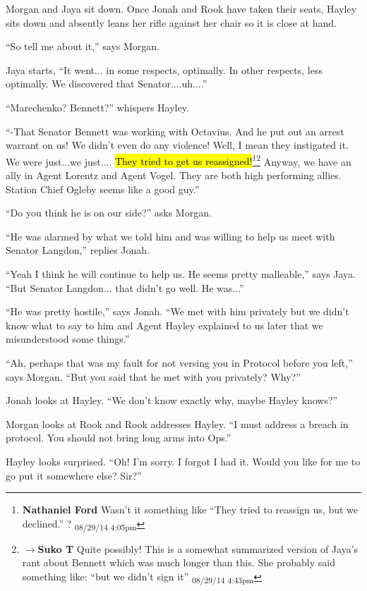Morgan and Jaya sit down.  Once Jonah and Rook have taken their seats, Hayley sits down and absently leans her rifle against her chair so it is close at hand. 

``So tell me about it,'' says Morgan.

Jaya starts, ``It went... in some respects, optimally.  In other respects, less optimally.  We discovered that Senator....uh....''

``Marechenko?  Bennett?'' whispers Hayley.

``-That Senator Bennett was working with Octavius.  And he put out an arrest warrant on us!  We didn't even do any violence! Well, I mean they instigated it.  We were just...we just.... \hl{They tried to get us reassigned!}\footnote{\textbf{Nathaniel Ford }Wasn't it something like ``They tried to reassign us, but we declined.'' ? \textsubscript{08/29/14 4:05pm}}\footnote{$\rightarrow$\textbf{Suko T }Quite possibly!  This is a somewhat summarized version of Jaya's rant about Bennett which was much longer than this.  She probably said something like: ``but we didn't sign it'' \textsubscript{08/29/14 4:43pm}}  Anyway, we have an ally in Agent Lorentz and Agent Vogel. They are both high performing allies.  Station Chief Ogleby seems like a good guy.''

``Do you think he is on our side?'' asks Morgan.

``He was alarmed by what we told him and was willing to help us meet with Senator Langdon,'' replies Jonah.

``Yeah I think he will continue to help us. He seems pretty malleable,'' says Jaya.  ``But Senator Langdon... that didn't go well.  He was...''

``He was pretty hostile,'' says Jonah.  ``We met with him privately but we didn't know what to say to him and Agent Hayley explained to us later that we misunderstood some things.''

``Ah, perhaps that was my fault for not versing you in Protocol before you left,'' says Morgan.  ``But you said that he met with you privately?  Why?''

Jonah looks at Hayley.  ``We don't know exactly why, maybe Hayley knows?''

Morgan looks at Rook and Rook addresses Hayley. ``I must address a breach in protocol.  You should not bring long arms into Ops.''

Hayley looks surprised.  ``Oh!  I'm sorry.  I forgot I had it.  Would you like for me to go put it somewhere else?  Sir?''

